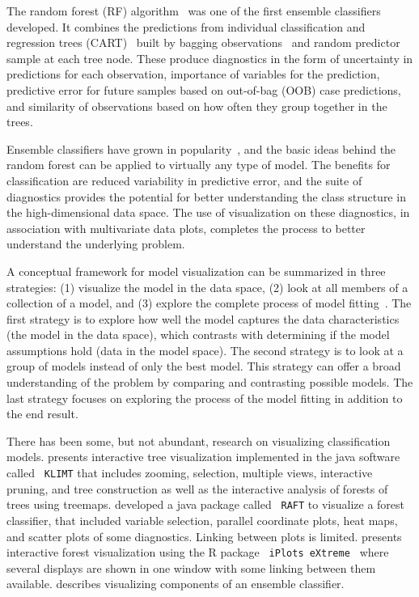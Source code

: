 \documentclass[smallextended,natbib]{svjour3}\usepackage[]{graphicx}\usepackage[]{xcolor}
\begin{document}
The random forest (RF) algorithm~\citep{breiman1996bagging} was one of the first ensemble classifiers developed. It combines the predictions from individual classification and regression trees (CART)~\citep{breiman1984cl} built by bagging observations~\citep{breiman1996bagging} and random predictor sample at each tree node. These produce diagnostics in the form of uncertainty in predictions for each observation, importance of variables for the prediction, predictive error for future samples based on out-of-bag (OOB) case predictions, and similarity of observations based on how often they group together in the trees.

Ensemble classifiers have grown in popularity~\citep{dietterish00, talbot09}, and the basic ideas behind the random forest can be applied to virtually any type of model. The benefits for classification are reduced variability in predictive error, and the suite of diagnostics provides the potential for better understanding the class structure in the high-dimensional data space. The use of visualization on these diagnostics, in association with multivariate data plots, completes the process to better understand the underlying problem.

A conceptual framework for model visualization can be summarized in three strategies: (1) visualize the model in the data space, (2) look at all members of a collection of a model, and (3) explore the complete process of model fitting~\citep{wickham2015visualizing}. The first strategy is to explore how well the model captures the data characteristics (the model in the data space), which contrasts with determining if the model assumptions hold (data in the model space). The second strategy is to look at a group of models instead of only the best model. This strategy can offer a broad understanding of the problem by comparing and contrasting possible models. The last strategy focuses on exploring the process of the model fitting in addition to the end result.

There has been some, but not abundant, research on visualizing classification models.
\cite{urbanek2002exploring} presents interactive tree visualization implemented in the java software called \verb# KLIMT# that includes zooming, selection, multiple views, interactive pruning, and tree construction as well as the interactive analysis of forests of trees using treemaps. \cite{cutler15raft} developed a java package called \verb# RAFT# to visualize a forest classifier, that included variable selection, parallel coordinate plots, heat maps, and scatter plots of some diagnostics. Linking between plots is limited. \cite{quach2012interactive} presents interactive forest visualization using the R package \verb# iPlots eXtreme # \citep{urbanek2011iplots} where several displays are shown in one window with some linking between them available. \cite{Silva2016} describes visualizing components of an ensemble classifier.
\end{document}
